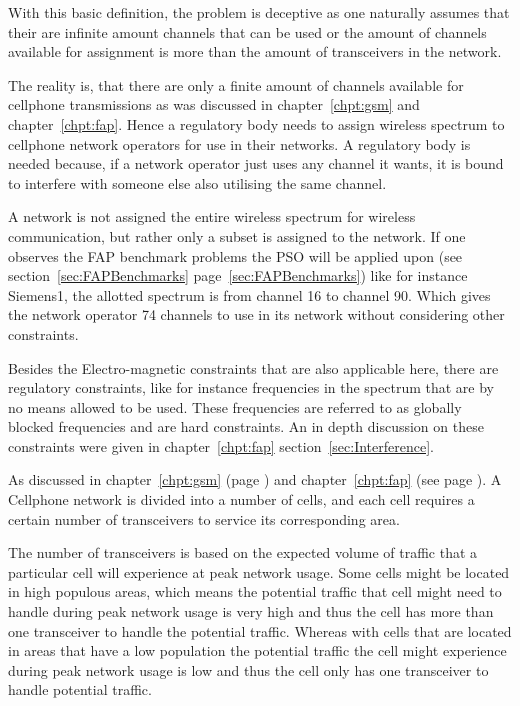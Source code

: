 With this basic definition, the problem is deceptive as one naturally assumes that their are infinite amount channels that can be used or the amount of channels available for assignment is more than the amount of transceivers in the network. 

The reality is, that there are only a finite amount of channels available for cellphone transmissions as was discussed in chapter~\ref{chpt:gsm} and chapter~\ref{chpt:fap}. Hence a regulatory body needs to assign wireless spectrum to cellphone network operators for use in their networks. A regulatory body is needed because, if a network operator just uses any channel it wants, it is bound to interfere with someone else also utilising the same channel.

A network is not assigned the entire wireless spectrum for wireless communication, but rather only a subset is assigned to the network. If one observes the FAP benchmark problems the PSO will be applied upon (see section~\ref{sec:FAPBenchmarks} page~\ref{sec:FAPBenchmarks}) like for instance Siemens1, the allotted spectrum is from channel 16 to channel 90. Which gives the network operator 74 channels to use in its network without considering other constraints. 

Besides the Electro-magnetic constraints that are also applicable here, there are regulatory constraints, like for instance frequencies in the spectrum that are by no means allowed to be used. These frequencies are referred to as globally blocked frequencies and are hard constraints. An in depth discussion on these constraints were given in chapter~\ref{chpt:fap} section~\ref{sec:Interference}.

As discussed in chapter~\ref{chpt:gsm} (page \pageref{chpt:gsm}) and chapter~\ref{chpt:fap} (see page \pageref{chpt:fap}). A Cellphone network is divided into a number of cells, and each cell requires a certain number of transceivers to service its corresponding area. 

The number of transceivers is based on the expected volume of traffic that a particular cell will experience at peak network usage. Some cells might be located in high populous areas, which means the potential traffic that cell might need to handle during peak network usage is very high and thus the cell has more than one transceiver to handle the potential traffic. Whereas with cells that are located in areas that have a low population the potential traffic the cell might experience during peak network usage is low and thus the cell only has one transceiver to handle potential traffic.

